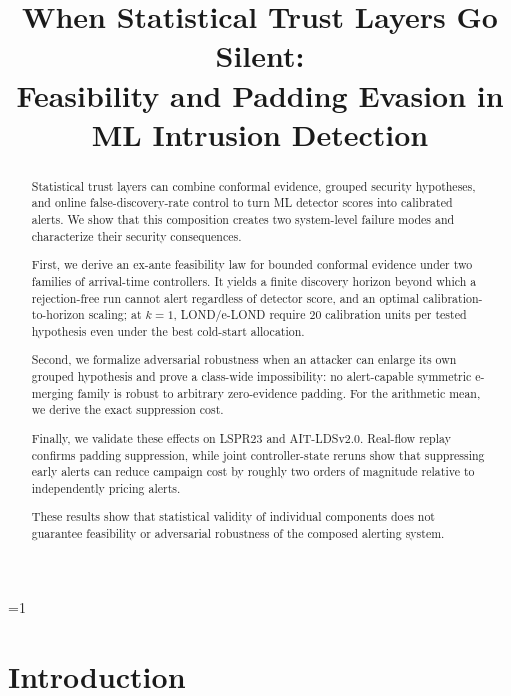\documentclass[conference]{IEEEtran}
\newcommand{\satmlanon}{1}
\begin{document}
\title{When Statistical Trust Layers Go Silent:\\Feasibility and Padding Evasion in ML Intrusion Detection}

\ifnum\satmlanon=1
  \author{}
\else
  \author{}
\fi

\maketitle

\begin{abstract}
Statistical trust layers can combine conformal evidence, grouped security hypotheses, and online
false-discovery-rate control to turn ML detector scores into calibrated alerts. We show that this
composition creates two system-level failure modes and characterize their security consequences.

First, we derive an ex-ante feasibility law for bounded conformal evidence under two families of
arrival-time controllers. It yields a finite discovery horizon beyond which a rejection-free run cannot
alert regardless of detector score, and an optimal calibration-to-horizon scaling; at $k=1$, LOND/e-LOND
require $20$ calibration units per tested hypothesis even under the best cold-start allocation.

Second, we formalize adversarial robustness when an attacker can enlarge its own grouped hypothesis and
prove a class-wide impossibility: no alert-capable symmetric e-merging family is robust to arbitrary
zero-evidence padding. For the arithmetic mean, we derive the exact suppression cost.

Finally, we validate these effects on LSPR23 and AIT-LDSv2.0. Real-flow replay confirms padding
suppression, while joint controller-state reruns show that suppressing early alerts can reduce campaign
cost by roughly two orders of magnitude relative to independently pricing alerts.

These results show that statistical validity of individual components does not guarantee feasibility or
adversarial robustness of the composed alerting system.
\end{abstract}

\section{Introduction}\label{sec:intro}
\end{document}
